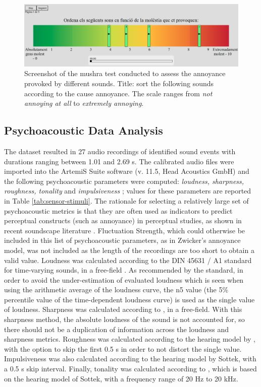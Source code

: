 \begin{figure}
  \label{fig:mushra-test}
  \centering
  \includegraphics[width=\textwidth]{Figures/mushraScreenShot02.png}
  \caption{Screenshot of the \gls{mushra} test conducted to assess the annoyance provoked by different sounds. Title: sort the following sounds according to the cause annoyance. The scale ranges from \emph{not annoying at all} to \emph{extremely annoying}.}
\end{figure}

\subsection{Psychoacoustic Data Analysis}

The dataset resulted in 27 audio recordings of identified sound events with durations ranging between 1.01 and 2.69 s. The calibrated audio files were imported into the ArtemiS Suite software (v. 11.5, Head Acoustics GmbH) and the following psychoacoustic parameters were computed: \emph{loudness, sharpness, roughness, tonality} and \emph{impulsiveness} \citep{PsychoacousticsfactsmodelsZwicker}; values for these parameters are reported in Table \ref{tab:sensor-stimuli}. The rationale for selecting a relatively large set of psychoacoustic metrics is that they are often used as indicators to predict perceptual constructs (such as annoyance) in perceptual studies, as shown in recent soundscape literature \citep{Aletta2016Soundscape,Aletta2017Dimensions}. Fluctuation Strength, which could otherwise be included in this list of psychoacoustic parameters, as in Zwicker's annoyance model, was not included as the length of the recordings are too short to obtain a valid value. Loudness was calculated according to the DIN 45631 / A1 standard for time-varying sounds, in a free-field \citep{DIN2008Calculation}. As recommended by the standard, in order to avoid the under-estimation of evaluated loudness which is seen when using the arithmetic average of the loudness curve, the \gls{n5} value (the 5\% percentile value of the time-dependent loudness curve) is used as the single value of loudness. Sharpness was calculated according to \citet{DIN2009measurement}, in a free-field. With this sharpness method, the absolute loudness of the sound is not accounted for, so there should not be a duplication of information across the loudness and sharpness metrics. Roughness was calculated according to the hearing model by \citet{Sottek2017Sound}, with the option to skip the first 0.5 s in order to not distort the single value. Impulsiveness was also calculated according to the hearing model by Sottek, with a 0.5 s skip interval. Finally, tonality was calculated according to \citet{ECMA742019Measurement}, which is based on the hearing model of Sottek, with a frequency range of 20 Hz to 20 kHz.


